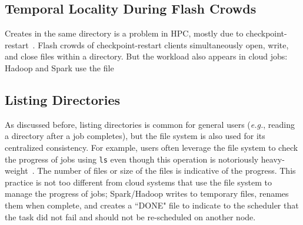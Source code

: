 
\subsection{Temporal Locality During Flash Crowds}
\label{sec:temporal-locality-during-flash-crowds}

Creates in the same directory is a problem in HPC, mostly due to
checkpoint-restart~\cite{bent_plfs_2009}. Flash crowds of checkpoint-restart
clients simultaneously open, write, and close files within a directory.  But
the workload also appears in cloud jobs: Hadoop and Spark use the file
  

\subsection{Listing Directories}
\label{sec:listing-directories}

As discussed before, listing directories is common for general users ({\it e.g.}, reading a
directory after a job completes), but the file system is also used for its
centralized consistency.  For example, users often leverage the file system to
check the progress of jobs using \texttt{ls} even though this operation is
notoriously heavy-weight~\cite{carns:ipdps09-pvfs, eshel:fast10-panache}. The
number of files or size of the files is indicative of the progress. This
practice is not too different from cloud systems that use the file system to
manage the progress of jobs; Spark/Hadoop writes to temporary files, renames
them when complete, and creates a ``DONE" file to indicate to the scheduler that
the task did not fail and should not be re-scheduled on another node.


